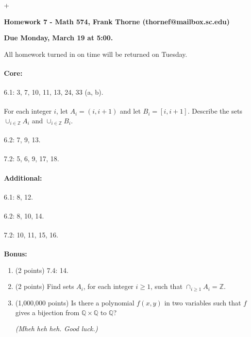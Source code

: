 \documentclass[12pt]{amsart}
\begin{document}
\setlength{\topmargin}{-2mm}
+




\begin{center}{\bf Homework 7 - Math 574, Frank Thorne (thornef@mailbox.sc.edu)}
\end{center}
\begin{center}
{\bf Due Monday, March 19 at 5:00.}
\end{center}
All homework turned in on time will be returned on Tuesday. 
\\
\\
{\bf Core:}
\\
\\
6.1: 3, 7, 10, 11, 13, 24, 33 (a, b).
\\
\\
For each integer $i$, let $A_i = (i, i + 1)$ and let $B_i = [i, i + 1]$. Describe the sets
$\cup_{i \in \mathbb{Z}} A_i$ and $\cup_{i \in \mathbb{Z}} B_i$.
\\
\\
6.2: 7, 9, 13.
\\
\\
7.2: 5, 6, 9, 17, 18.
\\
\\
{\bf Additional:}
\\
\\
6.1: 8, 12.
\\
\\
6.2: 8, 10, 14.
\\
\\
7.2: 10, 11, 15, 16.
\\
\\
{\bf Bonus:}
\begin{enumerate}
\item (2 points)
7.4: 14.

\item (2 points)
Find sets $A_i$, for each integer $i \geq 1$, such that $\cap_{i \geq 1} A_i = \mathbb{Z}$.

\item (1,000,000 points)
Is there a polynomial $f(x, y)$ in two variables such that $f$ gives a bijection from
$\mathbb{Q} \times \mathbb{Q}$ to $\mathbb{Q}$?

{\itshape (Mheh heh heh. Good luck.)}
\end{enumerate}
\end{document}
